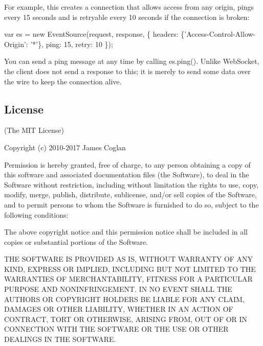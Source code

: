For example, this creates a connection that allows access from any origin, pings every 15 seconds and is retryable every 10 seconds if the connection is broken\+:


\begin{DoxyCode}
var es = new EventSource(request, response, \{
  headers: \{'Access-Control-Allow-Origin': '*'\},
  ping:    15,
  retry:   10
\});
\end{DoxyCode}


You can send a ping message at any time by calling {\ttfamily es.\+ping()}. Unlike Web\+Socket, the client does not send a response to this; it is merely to send some data over the wire to keep the connection alive.

\subsection*{License}

(The M\+IT License)

Copyright (c) 2010-\/2017 James Coglan

Permission is hereby granted, free of charge, to any person obtaining a copy of this software and associated documentation files (the \textquotesingle{}Software\textquotesingle{}), to deal in the Software without restriction, including without limitation the rights to use, copy, modify, merge, publish, distribute, sublicense, and/or sell copies of the Software, and to permit persons to whom the Software is furnished to do so, subject to the following conditions\+:

The above copyright notice and this permission notice shall be included in all copies or substantial portions of the Software.

T\+HE S\+O\+F\+T\+W\+A\+RE IS P\+R\+O\+V\+I\+D\+ED \textquotesingle{}AS IS\textquotesingle{}, W\+I\+T\+H\+O\+UT W\+A\+R\+R\+A\+N\+TY OF A\+NY K\+I\+ND, E\+X\+P\+R\+E\+SS OR I\+M\+P\+L\+I\+ED, I\+N\+C\+L\+U\+D\+I\+NG B\+UT N\+OT L\+I\+M\+I\+T\+ED TO T\+HE W\+A\+R\+R\+A\+N\+T\+I\+ES OF M\+E\+R\+C\+H\+A\+N\+T\+A\+B\+I\+L\+I\+TY, F\+I\+T\+N\+E\+SS F\+OR A P\+A\+R\+T\+I\+C\+U\+L\+AR P\+U\+R\+P\+O\+SE A\+ND N\+O\+N\+I\+N\+F\+R\+I\+N\+G\+E\+M\+E\+NT. IN NO E\+V\+E\+NT S\+H\+A\+LL T\+HE A\+U\+T\+H\+O\+RS OR C\+O\+P\+Y\+R\+I\+G\+HT H\+O\+L\+D\+E\+RS BE L\+I\+A\+B\+LE F\+OR A\+NY C\+L\+A\+IM, D\+A\+M\+A\+G\+ES OR O\+T\+H\+ER L\+I\+A\+B\+I\+L\+I\+TY, W\+H\+E\+T\+H\+ER IN AN A\+C\+T\+I\+ON OF C\+O\+N\+T\+R\+A\+CT, T\+O\+RT OR O\+T\+H\+E\+R\+W\+I\+SE, A\+R\+I\+S\+I\+NG F\+R\+OM, O\+UT OF OR IN C\+O\+N\+N\+E\+C\+T\+I\+ON W\+I\+TH T\+HE S\+O\+F\+T\+W\+A\+RE OR T\+HE U\+SE OR O\+T\+H\+ER D\+E\+A\+L\+I\+N\+GS IN T\+HE S\+O\+F\+T\+W\+A\+RE. 